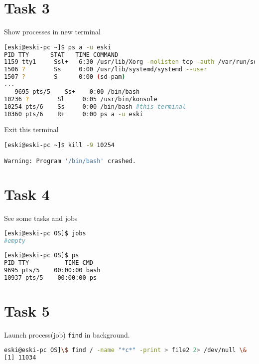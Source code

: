 \documentclass{article}
\begin{document}
\section*{Task 3}\vspace{0mm}
Show processes in new terminal
\begin{lstlisting}[language=BASH]
[eski@eski-pc ~]$ ps a -u eski
PID TTY      STAT   TIME COMMAND
1159 tty1     Ssl+   6:30 /usr/lib/Xorg -nolisten tcp -auth /var/run/sddm/{54bf40ef-e9d2-4ae4-9041-2434e7c0fbe7} -bac
1506 ?        Ss     0:00 /usr/lib/systemd/systemd --user
1507 ?        S      0:00 (sd-pam)
...
   9695 pts/5    Ss+    0:00 /bin/bash
10236 ?        Sl     0:05 /usr/bin/konsole
10254 pts/6    Ss     0:00 /bin/bash #this terminal
10360 pts/6    R+     0:00 ps a -u eski
\end{lstlisting}

Exit this terminal
\begin{lstlisting}[language=BASH]
[eski@eski-pc ~]$ kill -9 10254

Warning: Program '/bin/bash' crashed.
\end{lstlisting}

\section*{Task 4}\vspace{0mm}

See some tasks and jobs
\begin{lstlisting}[language=BASH]
[eski@eski-pc OS]$ jobs
#empty
\end{lstlisting}
\begin{lstlisting}[language=BASH]
[eski@eski-pc OS]$ ps
PID TTY          TIME CMD
9695 pts/5    00:00:00 bash
10937 pts/5    00:00:00 ps

\end{lstlisting}

\section*{Task 5}\vspace{0mm}
Launch process(job) \texttt{find} in background. 
\begin{lstlisting}[language=BASH]
eski@eski-pc OS]\$ find / -name "*c*" -print > file2 2> /dev/null \&
[1] 11034

\end{lstlisting}
\end{document}
